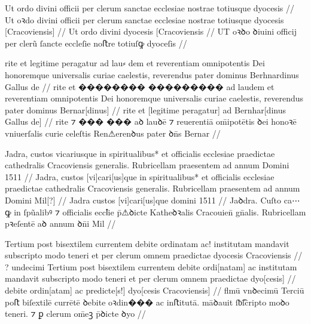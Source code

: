 


\ex \bg
\gla
{}
Ut ordo divini officii per clerum sanctae ecclesiae  nostrae totiusque 
dyocesis {}
//
\glRekonstrukcja
{}
Ut oꝛdo divini officii per clerum sanctae ecclesiae {} nostrae  totiusque 
dyocesis [Cracoviensis]
//
\glUbytki
{}
Ut ordo divini {} {} {} {} {} {} {} {} dyocesis [Cracoviensis
//
\glU
{}
UT oꝛꝺo ꝺiuini officij per clerũ ſancte eccleſie {} noﬅre  totiuſꝙ
dyoceſis {}
//
\endgl
\xe

\ex \bg
\gla
{}
rite et legitime peragatur ad {lau⸗  dem} et reverentiam 
omnipotentis Dei honoremque universalis curiae caelestis, reverendus 
pater dominus Berhnardinus Gallus de
//
\glRekonstrukcja
{}
rite et {��������} {���������} ad laudem et reverentiam 
omnipotentis Dei honoremque universalis curiae caelestis, reverendus 
pater dominus Bernar[dinus] {} {}
//
\glUbytki
{}
rite et [legitime peragatur] ad {} {}
{} {} {} {} {} {} {} {} {} {}
Bernhar[dinus Gallus de] 
//
\glU
{}
rite ⁊ {���} {���} aꝺ lauꝺē ⁊ reuerentiā om̄ipotētis ꝺei honoꝛē vniuerſalis curie celeſtis Ren⚠erenꝺus pater ꝺn̄s Bernar
//
\endgl
\xe


\ex \bg
\gla
{}
Jadra, custos vicariusque  in spiritualibus* et officialis ecclesiae praedictae cathedralis Cracoviensis 
generalis.
Rubricellam  praesentem ad annum Domini 1511
//
\glRekonstrukcja
{}
Jadra, custos [vi]cari[us]que {} in spiritualibus* et officialis ecclesiae praedictae cathedralis Cracoviensis 
generalis.
Rubricellam  praesentem ad annum Domini Mil[?]
//
\glUbytki
{}
Jadra custos [vi]cari[us]que
{} {} {} {} {} {} {} {} {} {}
{} {} {} {}
domini  1511
//
\glU
{}
Jaꝺdra. Cuſto ca⋯ꝙ {} in ſpũalibꝰ ⁊ oﬀicialis eccꝉie p̄⚠ꝺicte Katheꝺꝛalis Cracouien̄ gn̄alis. Rubricellam  pꝛeſentē aꝺ annum ꝺn̄i Mil
//
\endgl
\xe


\ex \bg
\gla
{}
{} {}  Tertium 
post bisextilem  currentem debite ordinatam ac! institutam mandavit 
subscripto modo teneri et per clerum omnem praedictae dyocesis Cracoviensis
{}
//
\glRekonstrukcja
{}
{?} undecimi  Tertium 
post bisextilem {} currentem debite ordi[natam] ac institutam mandavit 
subscripto modo teneri et per clerum omnem praedictae dyo[cesis]
{}
//
\glUbytki
{}
{} {} {} {} {} {} {}
debite ordin[atam] ac
{} {} {} {} {} {} {} {} {}
predicte[s!] dyo[cesis Cracoviensis]
//
\glU
{}
ﬂmū vnꝺecimū  Terciū poﬅ biſextilē {} currētē ꝺebite oꝛdin��� ac inﬅitutā. māꝺauit ſƀ͡ſcripto moꝺo teneri. ⁊ ꝑ  clerum om̄eꝫ p̄ꝺicte ꝺyo
{}
//
\endgl
\xe



